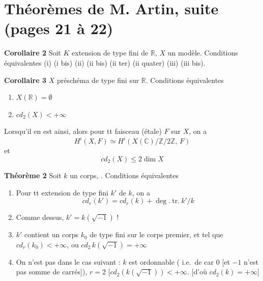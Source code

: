\documentclass[11pt,a4paper]{article}
\begin{document}
\section*{Théorèmes de M. Artin, suite (pages 21 à 22)}


\textbf{Corollaire 2} Soit $K$ extension de type fini de $\mathbb{R}$, $X$
un modèle. Conditions équivalentes (i) (i bis) (ii) (ii bis) (ii ter)
(ii quater) (iii) (iii bis).

\textbf{Corollaire 3} $X$ préschéma de type fini sur $\mathbb{R}$.
Conditions équivalentes
\begin{enumerate}
\item[(i)] $X(\mathbb{R}) = \emptyset$
\item[(ii)] $cd_2(X) < +\infty$
\end{enumerate}
 Lorsqu'il en est ainsi, alors pour tt faisceau (étale) $F$
sur $X$, on a
\[
H^i(X,F) \simeq H^i(X(\mathbb{C})/\mathbb{Z}/2\mathbb{Z},\, F)
\]
et \ill{}
\[
cd_2(X) \leqslant 2\dim X
\]

\textbf{Théorème 2} Soit $k$ un corps,  . Conditions équivalentes
\begin{enumerate}
\item[(i)] Pour tt extension de type fini $k'$ de $k$, on a
\[
cd_r(k') = cd_r(k) + \deg.\ \mathrm{tr.}\ k'/k
\]
\item[(i bis)] Comme dessus,  $k' = k(\sqrt{-1})$ ! 
\item[(ii)] $k'$ contient un corps $k_0$ de type fini sur le corps premier,
et tel que $cd_r(k_0) < +\infty$, ou $cd_2\, k(\sqrt{-1}) = +\infty$
\item[(iii)] On n'est pas dans le cas suivant : $k$ est ordonnable
( i.e.\ de car $0$ [et $-1$ n'est pas somme de carrés]),
$r = 2$ [$cd_2(k(\sqrt{-1})) < +\infty$. [d'où $cd_2(k) = +\infty$]
\end{enumerate}
\end{document}
